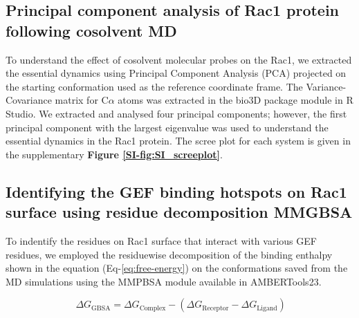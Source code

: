 \documentclass[12pt,a4paper]{achemso}
\begin{document}
\subsection{Principal component analysis of Rac1 protein following cosolvent MD}
To understand the effect of cosolvent molecular probes on the Rac1, we extracted the essential dynamics using Principal Component Analysis (PCA) projected on the starting conformation used as the reference coordinate frame. The Variance-Covariance matrix for C$\alpha$ atoms was extracted in the bio3D package\cite{bio3d} module in R Studio. We extracted and analysed four principal components; however, the first principal component with the largest eigenvalue was used to understand the essential dynamics in the Rac1 protein. The scree plot for each system is given in the supplementary \textbf{Figure \ref{SI-fig:SI_screeplot}}.

\subsection{Identifying the GEF binding hotspots on Rac1 surface using residue decomposition MMGBSA}

To indentify the residues on Rac1 surface that interact with various GEF residues, we employed the residuewise decomposition of the binding enthalpy shown in the equation (Eq-\ref{eq:free-energy}) on the conformations saved from the MD simulations using the MMPBSA module\cite{mmpbsa} available in AMBERTools23.

\begin{equation} \label{eq:free-energy}
     \   {\Delta}G_{\text{GBSA}} = {\Delta}G_{\text{Complex}} - ( {\Delta}G_{\text{Receptor}} - {\Delta}G_{\text{Ligand}})
\end{equation}
\end{document}

